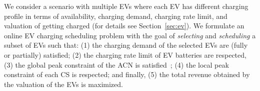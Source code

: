 \documentclass[journal]{IEEEtran}
\newcommand{\revv}[1]{{\color{black}#1}}%
\begin{document}


We consider a scenario with multiple EVs where each EV has different charging profile in terms of availability, charging demand, charging rate limit, and valuation of getting charged \revv{(for details see Section~\ref{sec:ev})}. We formulate an online EV charging scheduling problem with the goal of \textit{selecting} and \textit{scheduling} a subset of EVs such that: (1) the charging demand of the selected EVs are (fully or partially) satisfied; (2) the charging rate limit of EV batteries are respected, (3) the global peak constraint of the ACN is satisfied~\cite{lee2016adaptive}; (4) the local peak constraint of each CS is respected;  and finally, (5) the total revenue obtained by the valuation of the EVs is maximized. 
\end{document}
